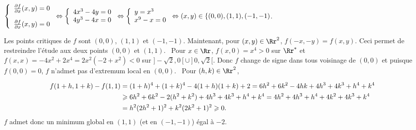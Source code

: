 {\begin{enumerate}
{\begin{center}
$\left\{
\begin{array}{l}
\frac{\partial f}{\partial x}(x,y)=0\\
\rule{0mm}{7mm}\frac{\partial f}{\partial x}(x,y)=0
\end{array}
\right.\Leftrightarrow\left\{
\begin{array}{l}
4x^3-4y=0\\
4y^3-4x=0
\end{array}
\right.\Leftrightarrow\left\{
\begin{array}{l}
y=x^3\\
x^9-x=0
\end{array}
\right.\Leftrightarrow(x,y)\in\{(0,0),(1,1),(-1,-1)$.
\end{center}
Les points critiques de $f$ sont $(0,0)$, $(1,1)$ et $(-1,-1)$.
Maintenant, pour $(x,y)\in\Rr^2$, $f(-x,-y)=f(x,y)$. Ceci permet de restreindre l'étude aux deux points $(0,0)$  et $(1,1)$.
\textbullet~Pour $x\in\Rr$, $f(x,0)=x^4>0$ sur $\Rr^*$ et $f(x,x)=-4x^2+2x^4=2x^2(-2+x^2)<0$ sur $]-\sqrt{2},0[\cup]0,\sqrt{2}[$. Donc $f$ change de signe dans tous voisinage de $(0,0)$ et puisque $f(0,0)=0$, $f$ n'admet pas d'extremum local en $(0,0)$.
\textbullet~Pour $(h,k)\in\Rr^2$,

\begin{align*}\ensuremath
f(1+h,1+k)-f(1,1)&=(1+h)^4+(1+k)^4-4(1+h)(1+k)+2=6h^2+6k^2-4hk+4h^3+4k^3+h^4+k^4\\
 &\geqslant6h^2+6k^2-2(h^2+k^2)+4h^3+4k^3+h^4+k^4=4h^2+4h^3+h^4+4k^2+4k^3+k^4\\
 &=h^2(2h^2+1)^2+k^2(2k^2+1)^2\geqslant0.
\end{align*}
$f$ admet donc un minimum global en $(1,1)$ (et en $(-1,-1)$) égal à $-2$.}
\end{enumerate}
}
